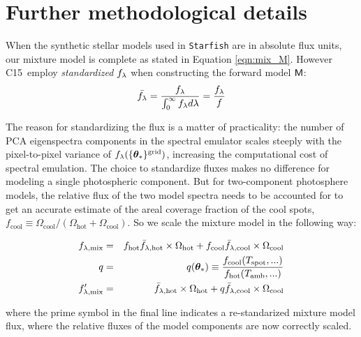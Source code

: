 \documentclass[twocolumn]{emulateapj}%
\newcommand{\iancze}{{\sc C15}}
\begin{document}
\clearpage
\pagebreak


\appendix

\section{Further methodological details}
\label{methods-details}

When the synthetic stellar models used in \texttt{Starfish} are in absolute flux units, our mixture model is complete as stated in Equation \ref{eqn:mix_M}.  However \iancze\ employ \emph{standardized} $f_\lambda$ when constructing the forward model $\mathsf{M}$:
\begin{eqnarray} \label{eqn:normalization}
\bar {f_\lambda} = \frac{f_\lambda}{\int_{0}^{\infty} f_\lambda d\lambda} = \frac{f_\lambda}{f}
\end{eqnarray}

The reason for standardizing the flux is a matter of practicality: the number of PCA eigenspectra components in the spectral emulator scales steeply with the pixel-to-pixel variance of $f_{\lambda}(\{{\bm \theta}_{\ast}\}^\textrm{grid})$, increasing the computational cost of spectral emulation.  The choice to standardize fluxes makes no difference for modeling a single photospheric component.  But for two-component photosphere models, the relative flux of the two model spectra needs to be accounted for to get an accurate estimate of the areal coverage fraction of the cool spots, $f_{\mathrm{cool}} \equiv \Omega_{\mathrm{cool}}/(\Omega_{\mathrm{hot}}+\Omega_{\mathrm{cool}})$.  So we scale the mixture model in the following way:

\begin{eqnarray} \label{eqn:norm_scaling}
f_{\lambda, \mathrm{mix}} &=& f_{\mathrm{hot}} \bar f_{\lambda, \mathrm{hot}} \times \Omega_{\mathrm{hot}} + f_{\mathrm{cool}} \bar f_{\lambda, \mathrm{cool}} \times \Omega_{\mathrm{cool}} \\
q &=& q({\bm \theta}_{\ast})\equiv \frac{f_{\mathrm{cool}}(T_\textrm{spot}, ...)}{f_{\mathrm{hot}}(T_\textrm{amb}, ...)} \\
f_{\lambda, \mathrm{mix}}^{\prime} &=& \bar f_{\lambda, \mathrm{hot}} \times \Omega_{\mathrm{hot}} + q \bar f_{\lambda, \mathrm{cool}} \times \Omega_{\mathrm{cool}}
\end{eqnarray}

where the prime symbol in the final line indicates a re-standarized mixture model flux, where the relative fluxes of the model components are now correctly scaled.
\end{document}
